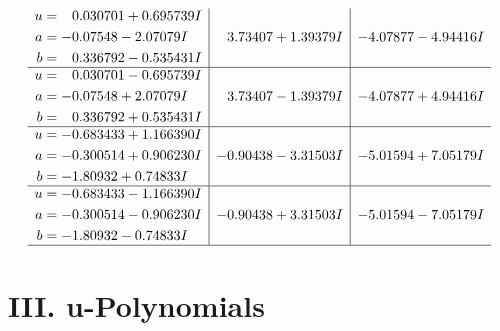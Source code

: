 \documentclass[1p]{elsarticle_modified}
\theoremstyle{definition}
\begin{document}
$$\begin{array}{c|c|c}
\begin{aligned}
u &= \phantom{-}0.030701 + 0.695739 I \\
a &= -0.07548 - 2.07079 I \\
b &= \phantom{-}0.336792 - 0.535431 I\end{aligned}
 & \phantom{-}3.73407 + 1.39379 I & -4.07877 - 4.94416 I \\ \hline\begin{aligned}
u &= \phantom{-}0.030701 - 0.695739 I \\
a &= -0.07548 + 2.07079 I \\
b &= \phantom{-}0.336792 + 0.535431 I\end{aligned}
 & \phantom{-}3.73407 - 1.39379 I & -4.07877 + 4.94416 I \\ \hline\begin{aligned}
u &= -0.683433 + 1.166390 I \\
a &= -0.300514 + 0.906230 I \\
b &= -1.80932 + 0.74833 I\end{aligned}
 & -0.90438 - 3.31503 I & -5.01594 + 7.05179 I \\ \hline\begin{aligned}
u &= -0.683433 - 1.166390 I \\
a &= -0.300514 - 0.906230 I \\
b &= -1.80932 - 0.74833 I\end{aligned}
 & -0.90438 + 3.31503 I & -5.01594 - 7.05179 I\\
 \hline 
 \end{array}$$\newpage
\newpage\renewcommand{\arraystretch}{1}
\centering \section*{ III. u-Polynomials}
\end{document}
